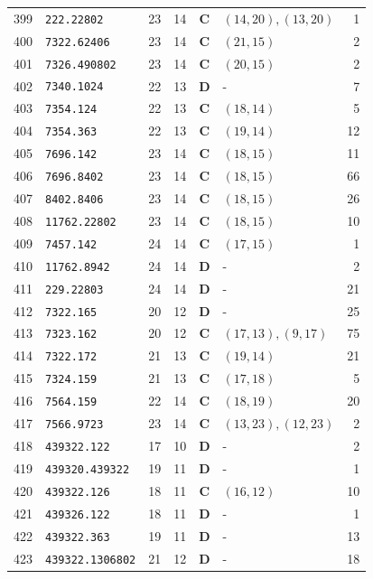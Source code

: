 \documentclass[11pt,a4paper]{article}
\begin{document}
\begin{small}
\begin{longtable}{r l c c c l r}
399 & \texttt{222.22802} & 23 & 14 & \textbf{C} & $(14,20), (13,20)$ & 1 \\
400 & \texttt{7322.62406} & 23 & 14 & \textbf{C} & $(21,15)$ & 2 \\
401 & \texttt{7326.490802} & 23 & 14 & \textbf{C} & $(20,15)$ & 2 \\
402 & \texttt{7340.1024} & 22 & 13 & \textbf{D} & - & 7 \\
403 & \texttt{7354.124} & 22 & 13 & \textbf{C} & $(18,14)$ & 5 \\
404 & \texttt{7354.363} & 22 & 13 & \textbf{C} & $(19,14)$ & 12 \\
405 & \texttt{7696.142} & 23 & 14 & \textbf{C} & $(18,15)$ & 11 \\
406 & \texttt{7696.8402} & 23 & 14 & \textbf{C} & $(18,15)$ & 66 \\
407 & \texttt{8402.8406} & 23 & 14 & \textbf{C} & $(18,15)$ & 26 \\
408 & \texttt{11762.22802} & 23 & 14 & \textbf{C} & $(18,15)$ & 10 \\
409 & \texttt{7457.142} & 24 & 14 & \textbf{C} & $(17,15)$ & 1 \\
410 & \texttt{11762.8942} & 24 & 14 & \textbf{D} & - & 2 \\
411 & \texttt{229.22803} & 24 & 14 & \textbf{D} & - & 21 \\
412 & \texttt{7322.165} & 20 & 12 & \textbf{D} & - & 25 \\
413 & \texttt{7323.162} & 20 & 12 & \textbf{C} & $(17,13), (9,17)$ & 75 \\
414 & \texttt{7322.172} & 21 & 13 & \textbf{C} & $(19,14)$ & 21 \\
415 & \texttt{7324.159} & 21 & 13 & \textbf{C} & $(17,18)$ & 5 \\
416 & \texttt{7564.159} & 22 & 14 & \textbf{C} & $(18,19)$ & 20 \\
417 & \texttt{7566.9723} & 23 & 14 & \textbf{C} & $(13,23), (12,23)$ & 2 \\
418 & \texttt{439322.122} & 17 & 10 & \textbf{D} & - & 2 \\
419 & \texttt{439320.439322} & 19 & 11 & \textbf{D} & - & 1 \\
420 & \texttt{439322.126} & 18 & 11 & \textbf{C} & $(16,12)$ & 10 \\
421 & \texttt{439326.122} & 18 & 11 & \textbf{D} & - & 1 \\
422 & \texttt{439322.363} & 19 & 11 & \textbf{D} & - & 13 \\
423 & \texttt{439322.1306802} & 21 & 12 & \textbf{D} & - & 18 \\

\end{longtable}
\end{small}
\end{document}
